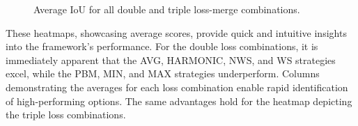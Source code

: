 \begin{figure}[H]%
  \centering
  \caption[Overall performance of triple combinations]{Average \ac{IoU} for all double and triple loss-merge combinations.}
  \label{overall_double_triple_medaka}
\end{figure}

These heatmaps, showcasing average scores, provide quick and intuitive insights into the framework's performance. For the double loss combinations, it is immediately apparent that the AVG, HARMONIC, NWS, and WS strategies excel, while the PBM, MIN, and MAX strategies underperform. Columns demonstrating the averages for each loss combination enable rapid identification of high-performing options. The same advantages hold for the heatmap depicting the triple loss combinations.

